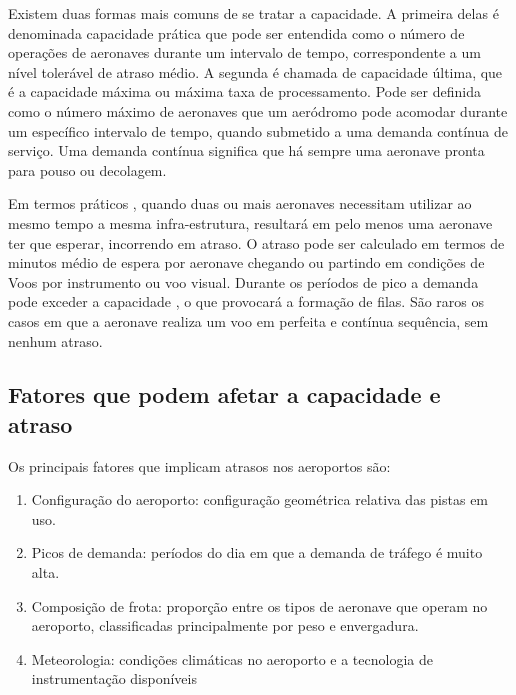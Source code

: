 \documentclass[12pt]{article}
\begin{document}
Existem duas formas mais comuns de se tratar a capacidade. A primeira delas
é denominada capacidade prática que pode ser entendida como o número de 
operações de aeronaves durante um intervalo de tempo, correspondente a um
nível tolerável de atraso médio. A segunda é chamada de capacidade última,
que é a capacidade máxima ou máxima taxa de processamento. Pode ser 
definida como o número máximo de aeronaves que um aeródromo pode acomodar
durante um específico intervalo de tempo, quando submetido a uma demanda
contínua de serviço. Uma demanda contínua significa que há sempre uma 
aeronave pronta para pouso ou decolagem. 

Em termos práticos , quando duas ou mais aeronaves necessitam utilizar ao
mesmo tempo a mesma infra-estrutura, resultará em pelo menos uma aeronave 
ter que esperar, incorrendo em atraso. O atraso pode ser calculado em termos
de minutos médio de espera por aeronave chegando ou partindo em condições 
de Voos por instrumento ou voo visual. Durante os períodos de pico a demanda
pode exceder a capacidade , o que provocará a formação de filas. São raros
os casos em que a aeronave realiza um voo em perfeita e contínua sequência,
sem nenhum atraso. 

\subsection{Fatores que podem afetar a capacidade e atraso}

Os principais fatores que implicam atrasos nos aeroportos são:


\begin{enumerate}
  
  \item Configuração do aeroporto: configuração geométrica relativa das pistas 
    em uso.

  \item Picos de demanda: períodos do dia em que a demanda de tráfego é muito
    alta.

  \item Composição de frota: proporção entre os tipos de aeronave que operam no 
  aeroporto, classificadas principalmente por peso e envergadura.

  \item Meteorologia: condições climáticas no aeroporto e a tecnologia de 
  instrumentação disponíveis

\end{enumerate}
\end{document}
